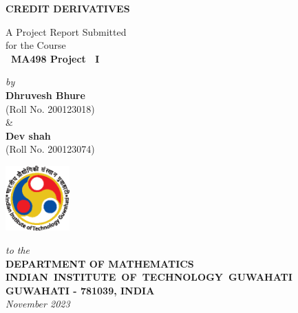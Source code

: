 \documentclass[11pt,a4paper]{report}
\theoremstyle{plain}
\theoremstyle{definition}
\theoremstyle{remark}
\begin{document}


\begin{titlepage}
\enlargethispage{3cm}

\begin{center}

\vspace*{-2cm}


\textbf{\Large CREDIT DERIVATIVES}

\vfill

 A Project Report Submitted \\
for the Course \\[1cm]

{\bf\Large\ MA498 Project ~I }\\[.1in]

 \vfill

{\large \emph{by}}\\[5pt]
{\large\bf {Dhruvesh Bhure}}\\[5pt]
{\large (Roll No. 200123018)}\\[3pt]
{\large {\&}}\\[5pt]
{\large\bf {Dev shah}}\\[5pt] 
{\large (Roll No. 200123074)}


\vfill
\includegraphics[height=2.5cm]{iitglogo}

\vspace*{0.5cm}

{\em\large to the}\\[10pt]
{\bf\large DEPARTMENT OF MATHEMATICS} \\[5pt]
{\bf\large \mbox{INDIAN INSTITUTE OF TECHNOLOGY GUWAHATI}}\\[5pt]
{\bf\large GUWAHATI - 781039, INDIA}\\[10pt]
{\it\large November 2023}
\end{center}

\end{titlepage}

\clearpage
\end{document}
